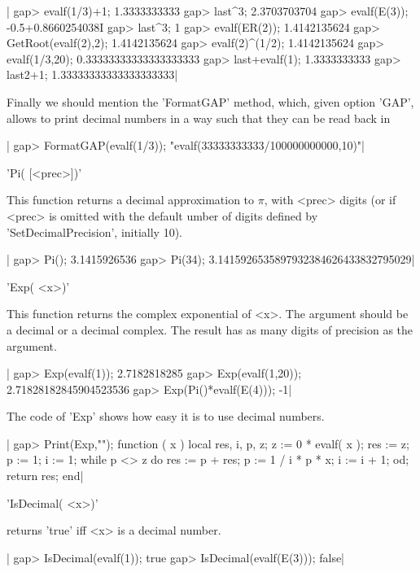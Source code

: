 |    gap> evalf(1/3)+1;
    1.3333333333
    gap> last^3;
    2.3703703704
    gap> evalf(E(3));
    -0.5+0.8660254038I
    gap> last^3;
    1
    gap> evalf(ER(2));
    1.4142135624
    gap> GetRoot(evalf(2),2);
    1.4142135624
    gap> evalf(2)^(1/2);
    1.4142135624
    gap> evalf(1/3,20);
    0.33333333333333333333
    gap> last+evalf(1);
    1.3333333333
    gap> last2+1;
    1.33333333333333333333|

Finally  we should mention the 'FormatGAP'  method, which, given option 'GAP',
allows  to print decimal numbers in  a way such that they  can be read back in
\GAP\:\

|    gap> FormatGAP(evalf(1/3));
    "evalf(33333333333/100000000000,10)"|

%
%

'Pi( [<prec>])'

This function  returns a  decimal approximation  to $\pi$,  with <prec>
digits  (or if  <prec>  is omitted  with the  default  umber of  digits
defined by 'SetDecimalPrecision', initially 10).

|    gap> Pi();
    3.1415926536
    gap> Pi(34);
    3.1415926535897932384626433832795029|

%
%

'Exp( <x>)'

This  function returns  the complex  exponential of  <x>. The  argument
should be a decimal or a decimal complex. The result has as many digits
of precision as the argument.

|    gap> Exp(evalf(1));
    2.7182818285
    gap> Exp(evalf(1,20));
    2.71828182845904523536
    gap> Exp(Pi()*evalf(E(4)));
    -1|

The code of 'Exp' shows how easy it is to use decimal numbers.

|    gap> Print(Exp,"\n");
    function ( x )
      local  res, i, p, z;
      z := 0 * evalf( x );
      res := z;
      p := 1;
      i := 1;
      while p <> z  do
        res := p + res;
        p := 1 / i * p * x;
        i := i + 1;
      od;
      return res;
    end|

%
%

'IsDecimal( <x>)'

returns 'true' iff <x> is a decimal number.

|    gap> IsDecimal(evalf(1));
    true
    gap> IsDecimal(evalf(E(3)));
    false|

